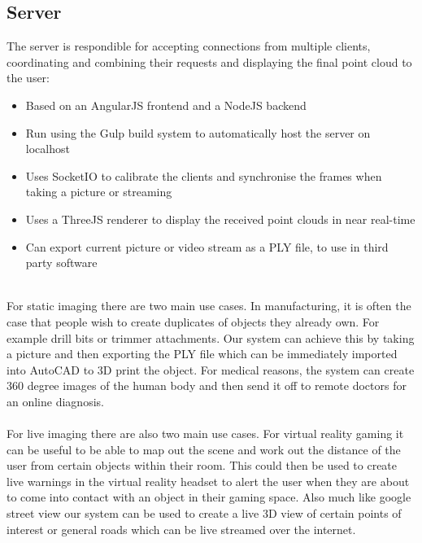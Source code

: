 \documentclass{article}
\begin{document}
\subsection{Server}
The server is respondible for accepting connections from multiple clients, coordinating and combining their requests and displaying the final point cloud to the user:
\begin{itemize}
\item Based on an AngularJS frontend and a NodeJS backend
\item Run using the Gulp build system to automatically host the server on localhost
\item Uses SocketIO to calibrate the clients and synchronise the frames when taking a picture or streaming
\item Uses a ThreeJS renderer to display the received point clouds in near real-time
\item Can export current picture or video stream as a PLY file, to use in third party software
\end{itemize}
~\\
For static imaging there are two main use cases. In manufacturing, it is often the case that people wish to create duplicates of objects they already own. For example drill bits or trimmer attachments. Our system can achieve this by taking a picture and then exporting the PLY file which can be immediately imported into AutoCAD to 3D print the object. For medical reasons, the system can create 360 degree images of the human body and then send it off to remote doctors for an online diagnosis.
\\\\
For live imaging there are also two main use cases. For virtual reality gaming it can be useful to be able to map out the scene and work out the distance of the user from certain objects within their room. This could then be used to create live warnings in the virtual reality headset to alert the user when they are about to come into contact with an object in their gaming space. Also much like google street view our system can be used to create a live 3D view of certain points of interest or general roads which can be live streamed over the internet.
\newpage
\end{document}

